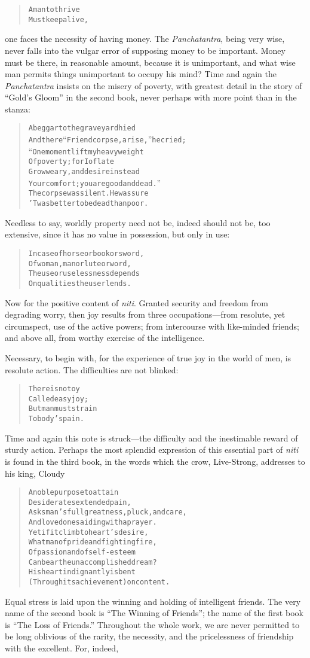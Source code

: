 \documentclass[article, twoside, 14pt]{memoir}
\renewenvironment{verbatim}{%
\begin{quote}%
\vskip -10pt%
\begin{alltt}\normalfont\large}{\end{alltt}%
\end{quote}%
\vskip -10pt
} %
\begin{document}
\begin{verbatim}
A man to thrive
Must keep alive,
\end{verbatim}
one faces the necessity of having money. The \emph{Panchatantra},
being very wise, never falls into the vulgar error of supposing
money to be important. Money must be there, in reasonable amount,
because it is unimportant, and what wise man permits things
unimportant to occupy his mind? Time and again the
\emph{Panchatantra} insists on the misery of poverty, with greatest
detail in the story of ``Gold's Gloom'' in the second book, never
perhaps with more point than in the stanza:

\begin{verbatim}
A beggar to the graveyard hied
And there “Friend corpse, arise,” he cried;
“One moment lift my heavy weight
Of poverty; for I of late
Grow weary, and desire instead
Your comfort; you are good and dead.”
The corpse was silent. He was sure
'Twas better to be dead than poor.
\end{verbatim}
Needless to say, worldly property need not be, indeed should not
be, too extensive, since it has no value in possession, but only in
use:

\begin{verbatim}
In case of horse or book or sword,
Of woman, man or lute or word,
The use or uselessness depends
On qualities the user lends.
\end{verbatim}
Now for the positive content of \emph{niti}. Granted security and
freedom from degrading worry, then joy results from three
occupations---from resolute, yet circumspect, use of the active
powers; from intercourse with like-minded friends; and above all,
from worthy exercise of the intelligence.

Necessary, to begin with, for the experience of true joy in the
world of men, is resolute action. The difficulties are not
blinked:

\begin{verbatim}
There is no toy
Called easy joy;
But man must strain
To body's pain.
\end{verbatim}
Time and again this note is struck---the difficulty and the
inestimable reward of sturdy action. Perhaps the most splendid
expression of this essential part of \emph{niti} is found in the
third book, in the words which the crow, Live-Strong, addresses to
his king, Cloudy

\begin{verbatim}
A noble purpose to attain
Desiderates extended pain,
Asks man's full greatness, pluck, and care,
And loved ones aiding with a prayer.
Yet if it climb to heart's desire,
What man of pride and fighting fire,
Of passion and of self-esteem
Can bear the unaccomplished dream?
His heart indignantly is bent
(Through its achievement) on content.
\end{verbatim}
Equal stress is laid upon the winning and holding of intelligent
friends. The very name of the second book is
``The Winning of Friends''; the name of the first book is
``The Loss of Friends.'' Throughout the whole work, we are never
permitted to be long oblivious of the rarity, the necessity, and
the pricelessness of friendship with the excellent. For, indeed,
\end{document}
